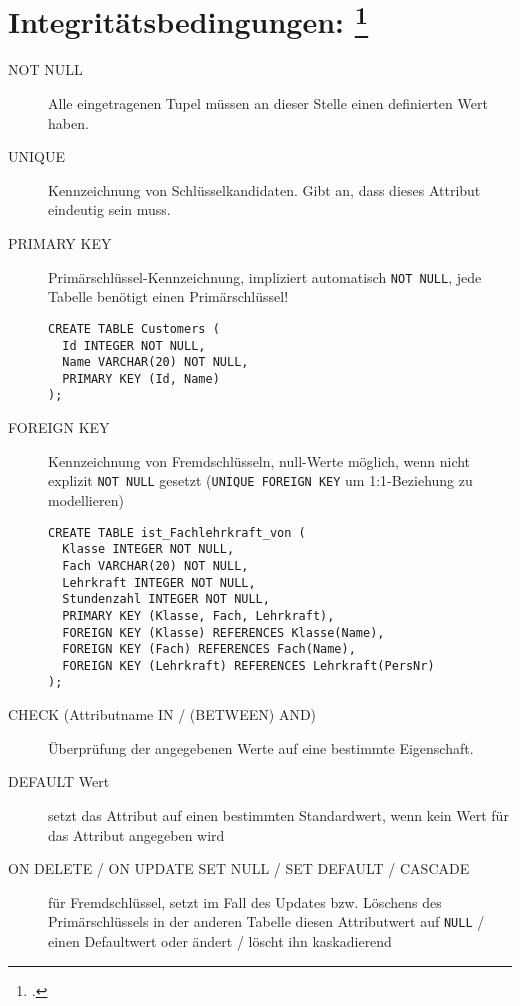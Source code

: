 \documentclass{bschlangaul-haupt}
\begin{document}
\section{Integritätsbedingungen:
\footcite[Seite 7]{db:fs:2}}

\begin{description}

\item[NOT NULL]

Alle eingetragenen Tupel müssen an dieser Stelle einen definierten Wert
haben.

\item[UNIQUE]

Kennzeichnung von Schlüsselkandidaten. Gibt an, dass dieses Attribut
eindeutig sein muss.

\item[PRIMARY KEY]

Primärschlüssel-Kennzeichnung, impliziert automatisch \verb|NOT NULL|,
jede Tabelle benötigt einen Primärschlüssel!

\begin{verbatim}
CREATE TABLE Customers (
  Id INTEGER NOT NULL,
  Name VARCHAR(20) NOT NULL,
  PRIMARY KEY (Id, Name)
);
\end{verbatim}

\item[FOREIGN KEY]

Kennzeichnung von Fremdschlüsseln, null-Werte möglich, wenn nicht
explizit \verb|NOT NULL| gesetzt (\verb|UNIQUE FOREIGN KEY| um
1:1-Beziehung zu modellieren)

\begin{verbatim}
CREATE TABLE ist_Fachlehrkraft_von (
  Klasse INTEGER NOT NULL,
  Fach VARCHAR(20) NOT NULL,
  Lehrkraft INTEGER NOT NULL,
  Stundenzahl INTEGER NOT NULL,
  PRIMARY KEY (Klasse, Fach, Lehrkraft),
  FOREIGN KEY (Klasse) REFERENCES Klasse(Name),
  FOREIGN KEY (Fach) REFERENCES Fach(Name),
  FOREIGN KEY (Lehrkraft) REFERENCES Lehrkraft(PersNr)
);
\end{verbatim}

\item[CHECK (Attributname IN / (BETWEEN) AND)]

Überprüfung der angegebenen Werte auf eine bestimmte Eigenschaft.

\item[DEFAULT Wert]

setzt das Attribut auf einen bestimmten Standardwert, wenn kein Wert für
das Attribut angegeben wird

\item[ON DELETE / ON UPDATE SET NULL / SET DEFAULT / CASCADE]

für Fremdschlüssel, setzt im Fall des Updates bzw. Löschens des
Primärschlüssels in der anderen Tabelle diesen Attributwert auf
\verb|NULL| / einen Defaultwert oder ändert / löscht ihn kaskadierend
\end{description}
\end{document}
